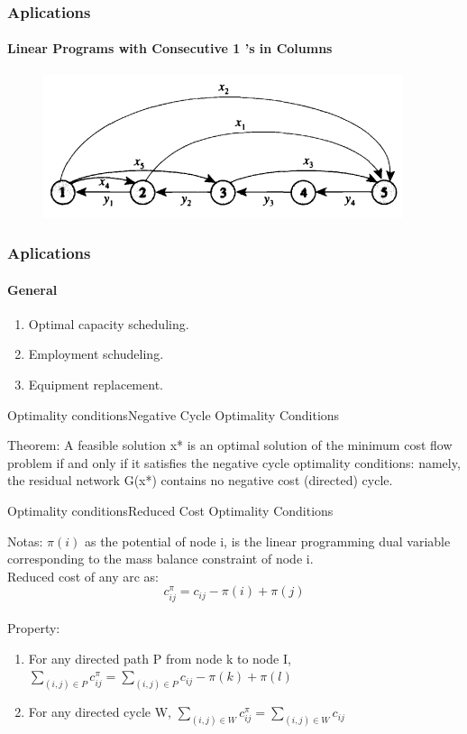 \documentclass{beamer}
\begin{document}
\begin{frame}
  \frametitle{Aplications}
  \framesubtitle{Linear Programs with Consecutive 1 's
  in Columns}
  \begin{figure}[h!t]
  \centering
  \includegraphics[scale = 0.8 ]{linearproblem.png}
  \end{figure}
\end{frame}

\begin{frame}
  \frametitle{Aplications}
  \framesubtitle{General}
  
  \begin{enumerate}
  \item Optimal capacity scheduling.
  \item Employment schudeling.
  \item Equipment replacement.
  \end{enumerate}
\end{frame}

\begin{frame}{Optimality conditions}{Negative Cycle Optimality Conditions}

\begin{block}{Theorem: }
  A feasible solution x* is
  an optimal solution of the minimum cost flow problem if and only if it satisfies the
  negative cycle optimality conditions: namely, the residual network G(x*) contains
  no negative cost (directed) cycle.
\end{block}
\end{frame}

\begin{frame}{Optimality conditions}{Reduced Cost Optimality Conditions}

  \begin{block}{Notas: }
  $\pi(i)$ as the potential of node i, is the linear programming dual variable corresponding to the mass balance constraint of node i. \\
  Reduced cost of any arc as: $$c_{ij}^{\pi} = c_{ij} - \pi(i) + \pi(j)$$ \\
  Property: \\ 
  \begin{enumerate}
    \item For any directed path P from node k to node I, $\displaystyle \sum_{(i,j) \in P} c_{ij}^{\pi} = \sum_{(i,j) \in P} c_{ij} - \pi(k)+\pi(l)$
    \item For any directed cycle W, $\displaystyle \sum_{(i,j) \in W} c_{ij}^{\pi} = \sum_{(i,j) \in W} c_{ij}$
  \end{enumerate}

  \end{block}
\end{frame}
\end{document}
